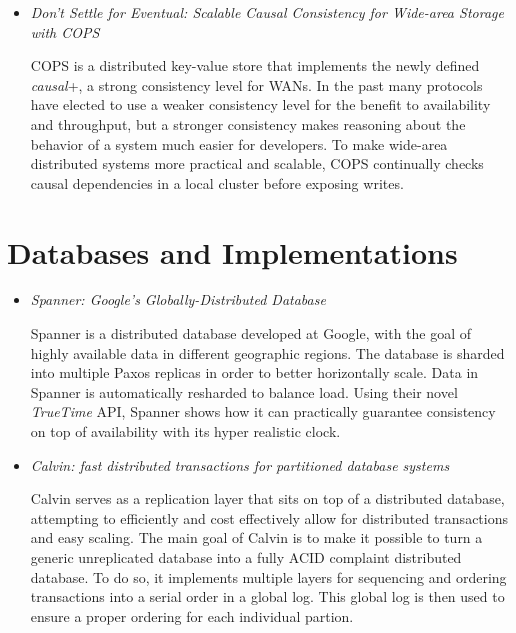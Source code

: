\documentclass{article}
\begin{document}
\begin{itemize}
	\item
	\textit{Don't Settle for Eventual: Scalable Causal Consistency for Wide-area Storage with COPS} \cite{LloydCOPS}

	COPS is a distributed key-value store that implements the newly defined \textit{causal}+, a strong consistency level for WANs.
	In the past many protocols have elected to use a weaker consistency level for the benefit to availability and throughput, but a stronger consistency makes reasoning about the behavior of a system much easier for developers.
	To make wide-area distributed systems more practical and scalable, COPS continually checks causal dependencies in a local cluster before exposing writes.



\end{itemize}

\section{Databases and Implementations}

\begin{itemize}

	\item
	\textit{Spanner: Google's Globally-Distributed Database} \cite{Spanner}

	Spanner is a distributed database developed at Google, with the goal of highly available data in different geographic regions.
	The database is sharded into multiple Paxos replicas in order to better horizontally scale. Data in Spanner is automatically resharded to balance load.
	Using their novel \textit{TrueTime} API, Spanner shows how it can practically guarantee consistency on top of availability with its hyper realistic clock.

	\item
	\textit{Calvin: fast distributed transactions for partitioned database systems} \cite{Calvin}

	Calvin serves as a replication layer that sits on top of a distributed database, attempting to efficiently and cost effectively allow for distributed transactions and easy scaling. The main goal of Calvin is to make it possible to turn a generic unreplicated database into a fully ACID complaint distributed database.
	To do so, it implements multiple layers for sequencing and ordering transactions into a serial order in a global log. This global log is then used to ensure a proper ordering for each individual partion.

\end{itemize}



\end{document}
